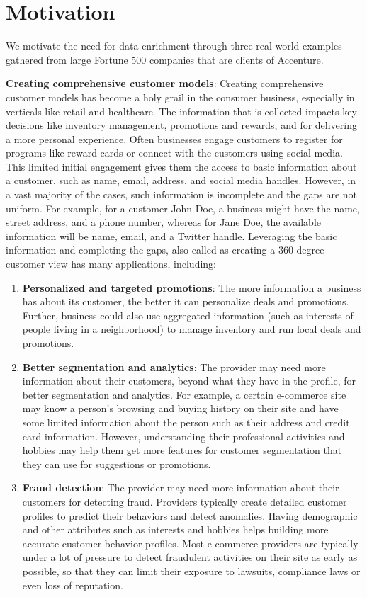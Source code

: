 \section{Motivation}
We motivate the need for data enrichment through three real-world examples gathered from large Fortune 500
companies that are clients of Accenture.

\textbf{Creating comprehensive customer models}:
		Creating comprehensive customer models has become a holy grail in the consumer business, especially in verticals like retail and healthcare. The information that is collected impacts key decisions
		like inventory management, promotions and rewards, and for delivering a more personal experience. Often businesses engage customers to register for programs like reward cards or connect with the 
		customers using social media. This limited initial engagement gives them the access to basic information about a customer, such as name, email, address, and social media handles. However, in  a vast 
		majority of the cases, such information is incomplete and the gaps are not uniform. For example, for a customer John Doe, a business might have the name, street address, and a phone number, whereas
		for Jane Doe, the available information will be name, email, and a Twitter handle. Leveraging the basic information and completing the gaps, also called as creating a 360 degree customer view has many 
		applications, including:  
		\begin{enumerate}
			\item \textbf{Personalized and targeted promotions}: The more information a business has about its customer, the better it can personalize deals and promotions. Further, business could also 
				use aggregated information (such as interests of people living in a neighborhood) to manage inventory and run local deals and promotions. 
			\item \textbf{Better segmentation and analytics}: The provider may need more information about their customers, beyond what they have in the profile, for better segmentation and analytics. 
				For example, a certain e-commerce site may know a person’s browsing and buying history on their site and have some limited information about the person such as their address and credit card 
				information. However, understanding their professional activities and hobbies may help them get more features for customer segmentation that they can use for suggestions or promotions.
				\item \textbf{Fraud detection}: The provider may need more information about their customers for detecting fraud. Providers typically create detailed customer profiles to predict their 
				behaviors and detect anomalies. Having demographic and other attributes such as interests and hobbies helps building more accurate customer behavior profiles. Most e-commerce providers 
				are typically under a lot of pressure to detect fraudulent activities on their site as early as possible, so that they can limit their exposure to lawsuits, compliance laws or even loss of 
				reputation.
		\end{enumerate}
